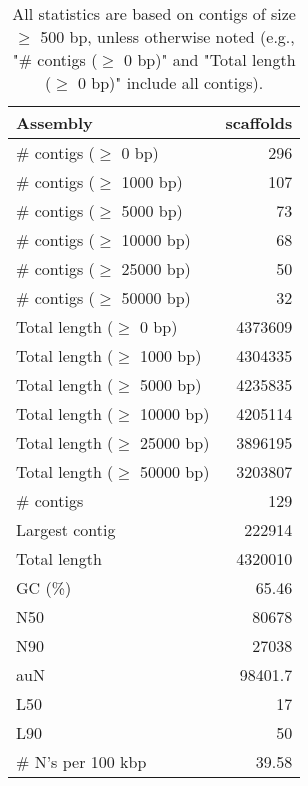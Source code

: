 \documentclass[12pt,a4paper]{article}
\begin{document}
\begin{table}[ht]
\begin{center}
\caption{All statistics are based on contigs of size $\geq$ 500 bp, unless otherwise noted (e.g., "\# contigs ($\geq$ 0 bp)" and "Total length ($\geq$ 0 bp)" include all contigs).}
\begin{tabular}{|l*{1}{|r}|}
\hline
Assembly & scaffolds \\ \hline
\# contigs ($\geq$ 0 bp) & 296 \\ \hline
\# contigs ($\geq$ 1000 bp) & 107 \\ \hline
\# contigs ($\geq$ 5000 bp) & 73 \\ \hline
\# contigs ($\geq$ 10000 bp) & 68 \\ \hline
\# contigs ($\geq$ 25000 bp) & 50 \\ \hline
\# contigs ($\geq$ 50000 bp) & 32 \\ \hline
Total length ($\geq$ 0 bp) & 4373609 \\ \hline
Total length ($\geq$ 1000 bp) & 4304335 \\ \hline
Total length ($\geq$ 5000 bp) & 4235835 \\ \hline
Total length ($\geq$ 10000 bp) & 4205114 \\ \hline
Total length ($\geq$ 25000 bp) & 3896195 \\ \hline
Total length ($\geq$ 50000 bp) & 3203807 \\ \hline
\# contigs & 129 \\ \hline
Largest contig & 222914 \\ \hline
Total length & 4320010 \\ \hline
GC (\%) & 65.46 \\ \hline
N50 & 80678 \\ \hline
N90 & 27038 \\ \hline
auN & 98401.7 \\ \hline
L50 & 17 \\ \hline
L90 & 50 \\ \hline
\# N's per 100 kbp & 39.58 \\ \hline
\end{tabular}
\end{center}
\end{table}
\end{document}
